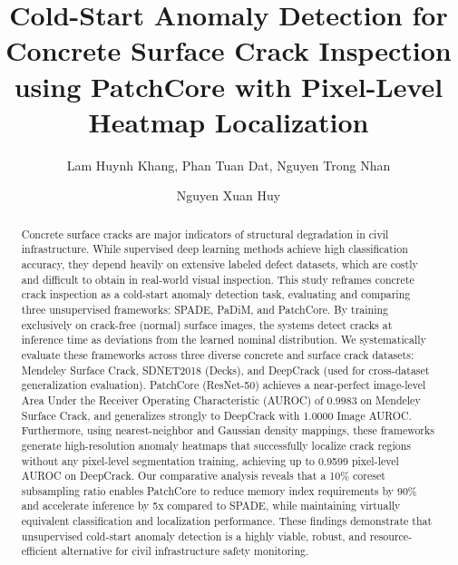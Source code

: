 \documentclass[runningheads]{llncs}
\begin{document}
\title{Cold-Start Anomaly Detection for Concrete Surface Crack Inspection using PatchCore with Pixel-Level Heatmap Localization}


\author{Lam Huynh Khang, Phan Tuan Dat, Nguyen Trong Nhan \and Nguyen Xuan Huy}



\maketitle

\begin{abstract}
Concrete surface cracks are major indicators of structural degradation in civil infrastructure. While supervised deep learning methods achieve high classification accuracy, they depend heavily on extensive labeled defect datasets, which are costly and difficult to obtain in real-world visual inspection. This study reframes concrete crack inspection as a cold-start anomaly detection task, evaluating and comparing three unsupervised frameworks: SPADE, PaDiM, and PatchCore. By training exclusively on crack-free (normal) surface images, the systems detect cracks at inference time as deviations from the learned nominal distribution. We systematically evaluate these frameworks across three diverse concrete and surface crack datasets: Mendeley Surface Crack, SDNET2018 (Decks), and DeepCrack (used for cross-dataset generalization evaluation). PatchCore (ResNet-50) achieves a near-perfect image-level Area Under the Receiver Operating Characteristic (AUROC) of 0.9983 on Mendeley Surface Crack, and generalizes strongly to DeepCrack with 1.0000 Image AUROC. Furthermore, using nearest-neighbor and Gaussian density mappings, these frameworks generate high-resolution anomaly heatmaps that successfully localize crack regions without any pixel-level segmentation training, achieving up to 0.9599 pixel-level AUROC on DeepCrack. Our comparative analysis reveals that a 10\% coreset subsampling ratio enables PatchCore to reduce memory index requirements by 90\% and accelerate inference by 5x compared to SPADE, while maintaining virtually equivalent classification and localization performance. These findings demonstrate that unsupervised cold-start anomaly detection is a highly viable, robust, and resource-efficient alternative for civil infrastructure safety monitoring.

\end{abstract}
\end{document}
